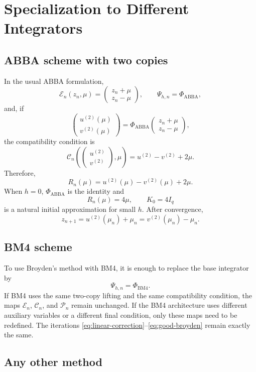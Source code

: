 \documentclass[11pt,a4paper]{article}
\begin{document}
\section{Specialization to Different Integrators}

\subsection{ABBA scheme with two copies}

In the usual ABBA formulation,
\[
    \mathcal E_n(z_n,\mu)
    =\begin{pmatrix}z_n+\mu\\z_n-\mu\end{pmatrix},
    \qquad
    \Psi_{h,n}=\Phi_{\mathrm{ABBA}},
\]
and, if
\[
    \begin{pmatrix}u^{(2)}(\mu)\\v^{(2)}(\mu)\end{pmatrix}
    =\Phi_{\mathrm{ABBA}}
     \begin{pmatrix}z_n+\mu\\z_n-\mu\end{pmatrix},
\]
the compatibility condition is
\[
    \mathcal C_n
    \left(
        \begin{pmatrix}u^{(2)}\\v^{(2)}\end{pmatrix},
        \mu
    \right)
    =u^{(2)}-v^{(2)}+2\mu.
\]
Therefore,
\[
    R_n(\mu)=u^{(2)}(\mu)-v^{(2)}(\mu)+2\mu.
\]
When $h=0$, $\Phi_{\mathrm{ABBA}}$ is the identity and
\[
    R_n(\mu)=4\mu,
    \qquad
    K_0=4I_q
\]
is a natural initial approximation for small $h$. After convergence,
\[
    z_{n+1}=u^{(2)}(\mu_n)+\mu_n
           =v^{(2)}(\mu_n)-\mu_n.
\]

\subsection{BM4 scheme}

To use Broyden's method with BM4, it is enough to replace the base integrator
by
\[
    \Psi_{h,n}=\Phi_{\mathrm{BM4}}.
\]
If BM4 uses the same two-copy lifting and the same compatibility condition,
the maps $\mathcal E_n$, $\mathcal C_n$, and $\mathcal P_n$ remain unchanged.
If the BM4 architecture uses different auxiliary variables or a different
final condition, only these maps need to be redefined. The iterations
\eqref{eq:linear-correction}--\eqref{eq:good-broyden} remain exactly the same.

\subsection{Any other method}
\end{document}
